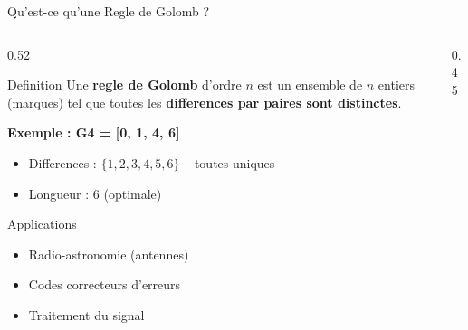 \documentclass[aspectratio=169,9pt]{beamer}
\begin{document}
\begin{frame}{Qu'est-ce qu'une Regle de Golomb ?}
    \begin{columns}[T]
        \begin{column}{0.52\textwidth}
            \begin{block}{Definition}
                Une \textbf{regle de Golomb} d'ordre $n$ est un ensemble de $n$ entiers (marques) tel que toutes les \textbf{differences par paires sont distinctes}.
            \end{block}
            \vspace{0.1cm}
            \textbf{Exemple : G4 = [0, 1, 4, 6]}
            \begin{itemize}\small
                \item Differences : $\{1, 2, 3, 4, 5, 6\}$ -- toutes uniques
                \item Longueur : 6 (optimale)
            \end{itemize}
            \vspace{0.1cm}
            \begin{alertblock}{Applications}
                \begin{itemize}\small
                    \item Radio-astronomie (antennes)
                    \item Codes correcteurs d'erreurs
                    \item Traitement du signal
                \end{itemize}
            \end{alertblock}
        \end{column}
        \begin{column}{0.45\textwidth}
            \centering
\end{column}
\end{columns}
\end{frame}
\end{document}
